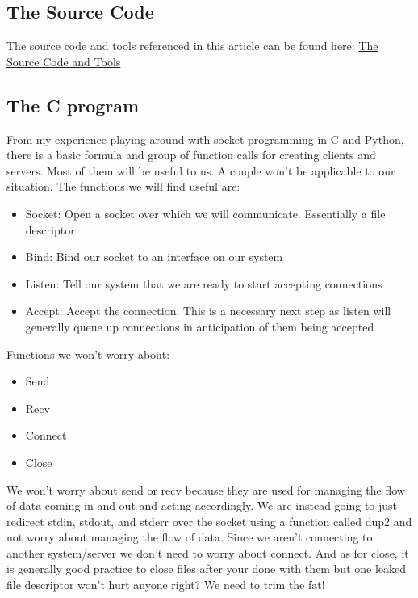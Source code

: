 \documentclass[11pt]{article}
\begin{document}
\subsection{The Source Code}
\label{sec-1-3}

The source code and tools referenced in this article can be found here:
\href{https://github.com/blischalk/slae/tree/master/exercise1}{The Source Code and Tools}

\subsection{The C program}
\label{sec-1-4}

From my experience playing around with socket programming in C and
Python, there is a basic formula and group of function calls for
creating clients and servers. Most of them will be useful to us. A
couple won't be applicable to our situation.  The functions we will
find useful are:

\begin{itemize}
\item Socket: Open a socket over which we will communicate. Essentially a file descriptor
\item Bind: Bind our socket to an interface on our system
\item Listen: Tell our system that we are ready to start accepting connections
\item Accept: Accept the connection. This is a necessary next step as listen will generally queue up connections in anticipation of them being accepted
\end{itemize}

Functions we won't worry about:

\begin{itemize}
\item Send
\item Recv
\item Connect
\item Close
\end{itemize}

We won't worry about send or recv because they are used for managing
the flow of data coming in and out and acting accordingly.  We are
instead going to just redirect stdin, stdout, and stderr over the
socket using a function called dup2 and not worry about managing the
flow of data. Since we aren't connecting to another system/server we
don't need to worry about connect. And as for close, it is generally
good practice to close files after your done with them but one leaked
file descriptor won't hurt anyone right? We need to trim the fat!
\end{document}
